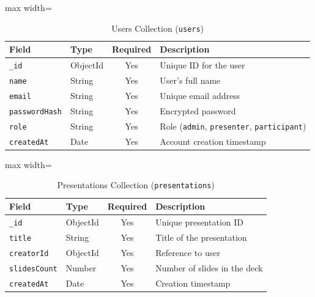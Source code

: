 \begin{table}[H]
\centering
\caption{Users Collection (\texttt{users})}
\label{tab:userschema}
\begin{adjustbox}{max width=\textwidth}
\begin{tabular}{llcl}
\toprule
\textbf{Field} & \textbf{Type} & \textbf{Required} & \textbf{Description} \\
\midrule
\texttt{\_id} & ObjectId & Yes & Unique ID for the user \\
\texttt{name} & String & Yes & User's full name \\
\texttt{email} & String & Yes & Unique email address \\
\texttt{passwordHash} & String & Yes & Encrypted password \\
\texttt{role} & String & Yes & Role (\texttt{admin}, \texttt{presenter}, \texttt{participant}) \\
\texttt{createdAt} & Date & Yes & Account creation timestamp \\
\bottomrule
\end{tabular}
\end{adjustbox}
\end{table}

\begin{table}[H]
\centering
\caption{Presentations Collection (\texttt{presentations})}
\label{tab:presschema}
\begin{adjustbox}{max width=\textwidth}
\begin{tabular}{llcl}
\toprule
\textbf{Field} & \textbf{Type} & \textbf{Required} & \textbf{Description} \\
\midrule
\texttt{\_id} & ObjectId & Yes & Unique presentation ID \\
\texttt{title} & String & Yes & Title of the presentation \\
\texttt{creatorId} & ObjectId & Yes & Reference to user \\
\texttt{slidesCount} & Number & Yes & Number of slides in the deck \\
\texttt{createdAt} & Date & Yes & Creation timestamp \\
\bottomrule
\end{tabular}
\end{adjustbox}
\end{table}

